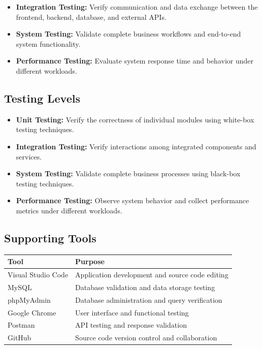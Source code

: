 \documentclass[12pt,a4paper]{article}
\begin{document}
{{\begin{itemize}
	\item \textbf{Integration Testing:} Verify communication and data exchange between the frontend, backend, database, and external APIs.
	
	\item \textbf{System Testing:} Validate complete business workflows and end-to-end system functionality.
	
	\item \textbf{Performance Testing:} Evaluate system response time and behavior under different workloads.
\end{itemize}
\subsection{Testing Levels}
\begin{itemize}
	\item \textbf{Unit Testing:}
	Verify the correctness of individual modules using white-box testing techniques.
	
	\item \textbf{Integration Testing:}
	Verify interactions among integrated components and services.
	
	\item \textbf{System Testing:}
	Validate complete business processes using black-box testing techniques.
	
	\item \textbf{Performance Testing:}
	Observe system behavior and collect performance metrics under different workloads.
\end{itemize}
\subsection{Supporting Tools}

\begin{table}[H]
	\centering
	\begin{tabular}{|p{4cm}|p{8cm}|}
		\hline
		\textbf{Tool} & \textbf{Purpose} \\ \hline
		Visual Studio Code & Application development and source code editing \\ \hline
		MySQL & Database validation and data storage testing \\ \hline
		phpMyAdmin & Database administration and query verification \\ \hline
		Google Chrome & User interface and functional testing \\ \hline
		Postman & API testing and response validation \\ \hline
		GitHub & Source code version control and collaboration \\ \hline
	\end{tabular}
	\label{tab:supporting_tools}
	

\end{table}}}
\end{document}
